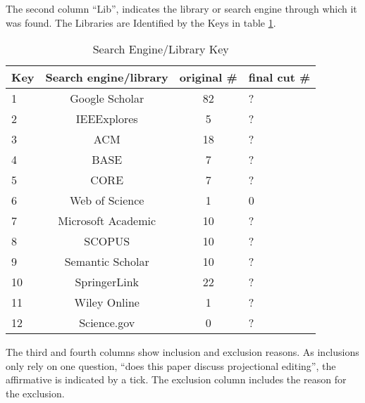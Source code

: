 The second column ``Lib'', indicates the library or search engine through which it was found.  
The Libraries are Identified by the Keys in table \ref{table:SearchEngineKey}.
\begin{table}[h]
    \begin{center}
        \begin{tabular}{ |l | c | c | l| } 
            \hline
            Key & Search engine/library     & original \# & final cut \#      \\
            \hline
            \hline
            1  & Google Scholar             & 82          & ?                 \\
            2  & IEEExplores                & 5           & ?                 \\
            3  & ACM                        & 18          & ?                 \\
            4  & BASE                       & 7           & ?                 \\
            5  & CORE                       & 7           & ?                 \\
            6  & Web of Science             & 1           & 0                 \\
            7  & Microsoft Academic         & 10          & ?                 \\
            8  & SCOPUS                     & 10          & ?                 \\
            9  & Semantic Scholar           & 10          & ?                 \\
            10 & SpringerLink               & 22          & ?                 \\
            11 & Wiley Online               & 1           & ?                 \\
            12 & Science.gov                & 0           & ?                 \\
            \hline
        \end{tabular}
    \end{center}
    \caption{Search Engine/Library Key}
    \label{table:SearchEngineKey}
\end{table}

The third and fourth columns show inclusion and exclusion reasons.
As inclusions only rely on one question, ``does this paper discuss projectional editing'', the affirmative is indicated by a tick.
The exclusion column includes the reason for  the exclusion.

